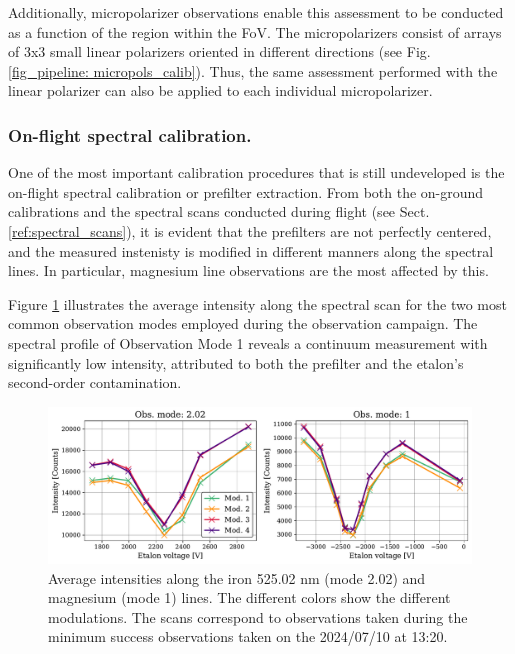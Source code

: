 Additionally, micropolarizer observations enable this assessment to be conducted as a function of the region within the FoV. The micropolarizers consist of arrays of 3x3 small linear polarizers oriented in different directions (see Fig. \ref{fig_pipeline: micropols_calib}). Thus, the same assessment performed with the linear polarizer can also be applied to each individual micropolarizer.


\subsubsection{\label{sect:pipeline_prefilter_scans_fit}On-flight spectral calibration.}

One of the most important calibration procedures that is still undeveloped is the on-flight spectral calibration or prefilter extraction. From both the on-ground calibrations and the spectral scans conducted during flight (see Sect. \ref{ref:spectral_scans}), it is evident that the prefilters are not perfectly centered, and the measured instenisty is modified in different manners along the spectral lines. In particular, magnesium line observations are the most affected by this.

Figure \ref{fig_pipeline: spectral_scans} illustrates the average intensity along the spectral scan for the two most common observation modes employed during the observation campaign. The spectral profile of Observation Mode 1 reveals a continuum measurement with significantly low intensity, attributed to both the prefilter and the etalon's second-order contamination.

\begin{figure}[t]
  \includegraphics[width=\textwidth]{figures/Pipeline/Spectral_scans_ecample.pdf}
  \caption[Spectral profile of observing modes 1 and 2.02.]{
    Average intensities along the iron 525.02 nm (mode 2.02) and magnesium (mode 1) lines. The different colors show the different modulations. The scans correspond to observations taken during the minimum success observations taken on the 2024/07/10 at 13:20.}
    \label{fig_pipeline: spectral_scans}
\end{figure}

